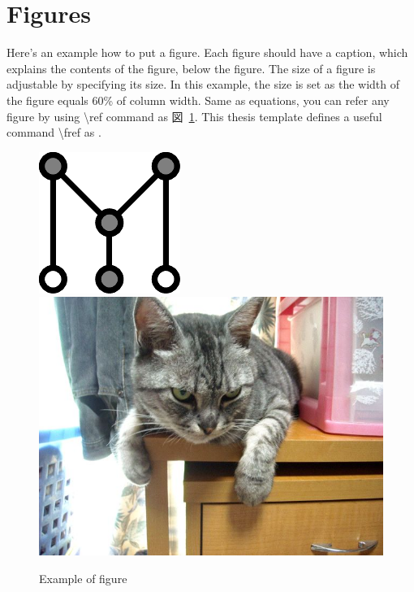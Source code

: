 \section{Figures}
Here's an example how to put a figure.
Each figure should have a caption, which explains the contents of the figure, below the figure.
The size of a figure is adjustable by specifying its size.
In this example, the size is set as the width of the figure equals 60\% of column width. 
Same as equations, you can refer any figure by using \textbackslash{}ref command as 図~\ref{fig:example}.
This thesis template defines a useful command \textbackslash{}fref as .
\begin{figure}[tb]
	\centering
		\includegraphics[width=0.6\hsize]{example-figure}
		\includegraphics[width=0.6\hsize]{cat}
	\caption{Example of figure}
	\label{fig:example}
\end{figure}

